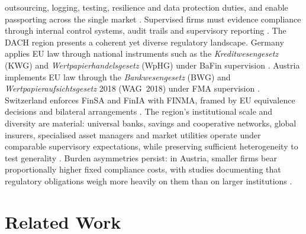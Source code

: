 \documentclass[oneside,10pt]{swissi}
\begin{document}
outsourcing, logging, testing, resilience and data protection duties, and enable passporting across the single market \cite{crd2013,esmaArt16,delReg2017_565,dora_2022,gdpr_2016,esmaArt34,ebaPSD2Art28}. Supervised firms must evidence compliance through internal control systems, audit trails and supervisory reporting \cite{solvency2_2009,esmaArt16,delReg2017_565,its2021451}. The DACH region presents a coherent yet diverse regulatory landscape. Germany applies EU law through national instruments such as the \emph{Kreditwesengesetz} (KWG) and \emph{Wertpapierhandelsgesetz} (WpHG) under BaFin supervision \cite{germany_kwg,germany_wphg,bafin_wphg}. Austria implements EU law through the \emph{Bankwesengesetz} (BWG) and \emph{Wertpapieraufsichtsgesetz} 2018 (WAG~2018) under FMA supervision \cite{austria_bwg,austria_wag2018,fmaIntegrated}. Switzerland enforces FinSA and FinIA with FINMA, framed by EU equivalence decisions and bilateral arrangements \cite{fedlex_finsa,fedlex_finia,finmaLegalBasis,ec_equivalence,sifEU2025}. The region’s institutional scale and diversity are material: universal banks, savings and cooperative networks, global insurers, specialised asset managers and market utilities operate under comparable supervisory expectations, while preserving sufficient heterogeneity to test generality \cite{ecbFISEA2024,efamaFactbook2025}. Burden asymmetries persist: in Austria, smaller firms bear proportionally higher fixed compliance costs, with studies documenting that regulatory obligations weigh more heavily on them than on larger institutions \cite{eibis2024Austria,fsb2019SME,bisfsi2018Proportionality,Kurz2025FMAAustria}.

\section{Related Work}
\end{document}
